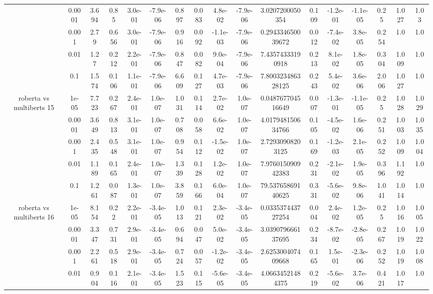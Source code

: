 \begin{tabular}{|c|c|c|c|c|c|c|c|c|c|c|c|c|c|c|c|c|}
 & 0.0001 & 3.694 & 0.85 & 3.0e-01 & -7.9e-06 & 0.897 & 0.083 & 4.8e-02 & -7.9e-06 & 3.0207200050354 & 0.109 & -1.2e-01 & -1.1e-05 & 0.25 & 1.027 & 1.03 \\
 & 0.001 & 2.79 & 0.656 & 3.0e-01 & -7.9e-06 & 0.916 & 0.092 & -1.1e-03 & -7.9e-06 & 0.294334650039672 & 0.012 & -7.4e-02 & 3.8e-05 & 0.254 & 1.0 & 1.0 \\
 & 0.01 & 1.27 & 0.212 & 2.2e-01 & -7.9e-06 & 0.847 & 0.082 & 9.0e-04 & -7.9e-06 & 7.43574333190918 & 0.213 & 8.1e-02 & 1.8e-05 & 0.304 & 1.009 & 1.0 \\
 & 0.1 & 1.574 & 0.106 & 1.1e-01 & -7.9e-06 & 6.609 & 0.127 & 4.7e-03 & -7.9e-06 & 7.800323486328125 & 0.243 & 5.4e-02 & 3.6e-06 & 2.006 & 1.027 & 1.0 \\
\hline
\multirow{5}{*}{roberta  vs multiberts 15} & 1e-05 & 7.723 & 0.267 & 2.4e-01 & 1.0e-07 & 1.031 & 0.114 & 2.7e-02 & 1.0e-07 & 0.048767704516649 & 0.007 & -1.3e-01 & -1.1e-05 & 0.25 & 1.028 & 1.029 \\
 & 0.0001 & 3.649 & 0.813 & 3.1e-01 & 1.0e-07 & 0.708 & 0.058 & 6.6e-02 & 1.0e-07 & 4.017948150634766 & 0.105 & -4.5e-02 & 1.6e-06 & 0.251 & 1.003 & 1.035 \\
 & 0.001 & 2.435 & 0.548 & 3.1e-01 & 1.0e-07 & 0.954 & 0.112 & -1.5e-02 & 1.0e-07 & 2.72930908203125 & 0.169 & -1.2e-03 & 2.1e-05 & 0.252 & 1.009 & 1.004 \\
 & 0.01 & 1.189 & 0.165 & 2.4e-01 & 1.0e-07 & 1.339 & 0.128 & 1.2e-02 & 1.0e-07 & 7.976015090942383 & 0.231 & -2.1e-02 & 1.9e-05 & 0.396 & 1.192 & 1.0 \\
 & 0.1 & 1.261 & 0.087 & 1.3e-01 & 1.0e-07 & 3.859 & 0.166 & 6.0e-04 & 1.0e-07 & 79.53765869140625 & 0.331 & -5.6e-02 & 9.8e-06 & 1.041 & 1.014 & 1.0 \\
\hline
\multirow{5}{*}{roberta  vs multiberts 16} & 1e-05 & 8.154 & 0.22 & 2.2e-01 & -3.4e-05 & 1.013 & 0.121 & 2.3e-02 & -3.4e-05 & 0.033537443727254 & 0.004 & 2.4e-02 & 1.2e-05 & 0.25 & 1.016 & 1.005 \\
 & 0.0001 & 3.347 & 0.731 & 2.9e-01 & -3.4e-05 & 0.694 & 0.047 & 5.0e-02 & -3.4e-05 & 3.039079666137695 & 0.234 & -8.7e-02 & -2.8e-05 & 0.267 & 1.019 & 1.022 \\
 & 0.001 & 2.261 & 0.518 & 2.9e-01 & -3.4e-05 & 0.724 & 0.057 & -1.2e-02 & -3.4e-05 & 2.625300407409668 & 0.165 & 1.5e-01 & -2.3e-06 & 0.252 & 1.019 & 1.008 \\
 & 0.01 & 0.904 & 0.116 & 2.1e-01 & -3.4e-05 & 1.523 & 0.115 & -5.6e-05 & -3.4e-05 & 4.06634521484375 & 0.219 & -5.6e-02 & 3.7e-06 & 0.421 & 1.017 & 1.0 \\

\end{tabular}
